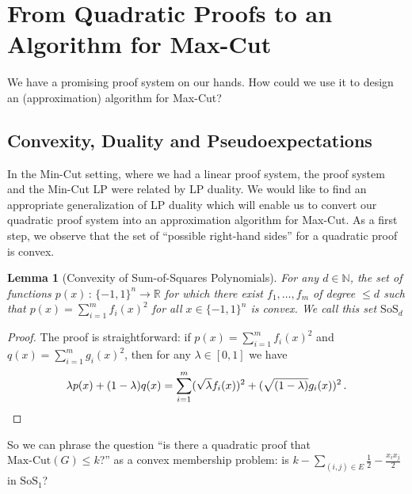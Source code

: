 \documentclass[11pt]{article}
\newtheorem{lemma}[theorem]{Lemma}
\newcommand{\R}{\mathbb{R}} %
\newcommand{\N}{\mathbb{N}} %
\newcommand{\SoS}{\text{SoS}}
\begin{document}
\section{From Quadratic Proofs to an Algorithm for Max-Cut}
We have a promising proof system on our hands.
How could we use it to design an (approximation) algorithm for Max-Cut?

\subsection{Convexity, Duality and Pseudoexpectations}
In the Min-Cut setting, where we had a linear proof system, the proof system and the Min-Cut LP were related by LP duality.
We would like to find an appropriate generalization of LP duality which will enable us to convert our quadratic proof system into an approximation algorithm for Max-Cut.
As a first step, we observe that the set of ``possible right-hand sides'' for a quadratic proof is convex.

\begin{lemma}[Convexity of Sum-of-Squares Polynomials]
  For any $d \in \N$, the set of functions $p(x) \, : \, \{-1,1\}^n \rightarrow \R$ for which there exist $f_1,\ldots,f_m$ of degree $\leq d$ such that $p(x) = \sum_{i=1}^m f_i(x)^2$ for all $x \in \{-1,1\}^n$ is convex.
  We call this set $\SoS_d$
\end{lemma}
\begin{proof}
The proof is straightforward: if $p(x) = \sum_{i=1}^m f_i(x)^2$ and $q(x) = \sum_{i=1}^m g_i(x)^2$, then for any $\lambda \in [0,1]$ we have
\[
  \lambda p(x) + (1-\lambda) q(x) = \sum_{i=1}^m (\sqrt{\lambda} f_i(x))^2 + ( \sqrt{(1-\lambda)} g_i(x))^2 \, . \qedhere
\]
\end{proof}

So we can phrase the question ``is there a quadratic proof that $\text{Max-Cut}(G) \leq k$?'' as a convex membership problem: is $k - \sum_{(i,j) \in E} \frac 12 - \frac{x_i x_j}{2}$ in $\SoS_1$?
\end{document}

